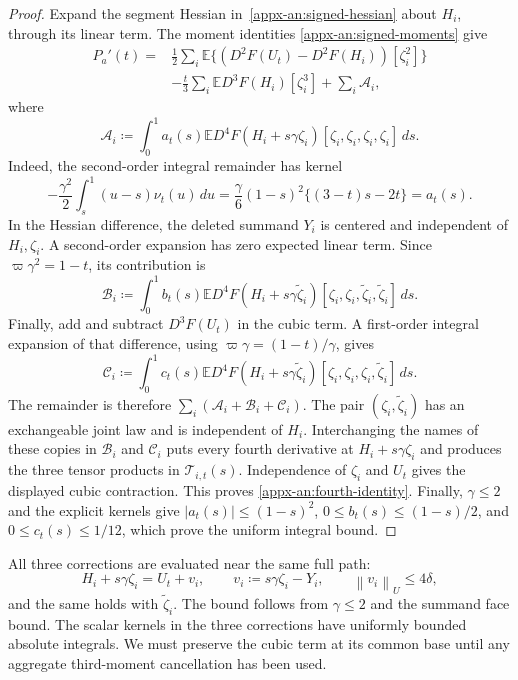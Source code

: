 \documentclass[11pt,letterpaper]{article}
\theoremstyle{remark}
\newcommand{\E}{\mathbb E}
\newcommand{\norm}[1]{\left\lVert#1\right\rVert}
\newcommand{\dd}{\,d}
\begin{document}
\begin{proof}
Expand the segment Hessian in~\eqref{appx-an:signed-hessian}
about \(H_i\), through its linear term. The moment identities
\eqref{appx-an:signed-moments} give
\begin{align*}
 P_a'(t)
 ={}&\frac12\sum_i\E\{(D^2F(U_t)-D^2F(H_i))[\zeta_i^2]\}\\
 &-\frac t3\sum_i\E D^3F(H_i)[\zeta_i^3]
       +\sum_i\mathcal A_i,
\end{align*}
where
\begin{equation}
 \mathcal A_i\coloneqq\int_0^1 a_t(s)
 \E D^4F(H_i+s\gamma\zeta_i)
       [\zeta_i,\zeta_i,\zeta_i,\zeta_i]\dd s.
 \label{appx-an:A}
\end{equation}
Indeed, the second-order integral remainder has kernel
\[
 -\frac{\gamma^2}{2}\int_s^1(u-s)\nu_t(u)\dd u
 =\frac\gamma6(1-s)^2\{(3-t)s-2t\}=a_t(s).
\]
In the Hessian difference, the deleted summand \(Y_i\) is centered
and independent of \(H_i,\zeta_i\). A second-order expansion has
zero expected linear term. Since \(\varpi\gamma^2=1-t\), its
contribution is
\begin{equation}
 \mathcal B_i\coloneqq\int_0^1 b_t(s)
 \E D^4F(H_i+s\gamma\widetilde\zeta_i)
       [\zeta_i,\zeta_i,\widetilde\zeta_i,\widetilde\zeta_i]\dd s.
 \label{appx-an:B}
\end{equation}
Finally, add and subtract \(D^3F(U_t)\) in the cubic term.
A first-order integral expansion of that difference, using
\(\varpi\gamma=(1-t)/\gamma\), gives
\begin{equation}
 \mathcal C_i\coloneqq\int_0^1 c_t(s)
 \E D^4F(H_i+s\gamma\widetilde\zeta_i)
       [\zeta_i,\zeta_i,\zeta_i,\widetilde\zeta_i]\dd s.
 \label{appx-an:C}
\end{equation}
The remainder is therefore \(\sum_i(\mathcal A_i+\mathcal B_i+\mathcal C_i)\).
The pair \((\zeta_i,\widetilde\zeta_i)\) has an exchangeable joint
law and is independent of \(H_i\). Interchanging the names of these
copies in \(\mathcal B_i\) and \(\mathcal C_i\) puts every fourth
derivative at \(H_i+s\gamma\zeta_i\) and produces the three tensor
products in \(\mathcal T_{i,t}(s)\). Independence of \(\zeta_i\)
and \(U_t\) gives the displayed cubic contraction. This proves
\eqref{appx-an:fourth-identity}. Finally, \(\gamma\le2\) and the
explicit kernels give
\( |a_t(s)|\le(1-s)^2\),
\(0\le b_t(s)\le(1-s)/2\), and
\(0\le c_t(s)\le1/12\), which prove the uniform integral bound.
\end{proof}

All three corrections are evaluated near the same full path:
\begin{equation}
 H_i+s\gamma\zeta_i=U_t+v_i,\qquad
 v_i\coloneqq s\gamma\zeta_i-Y_i,\qquad \norm{v_i}_U\le4\delta,
 \label{appx-an:translates}
\end{equation}
and the same holds with \(\widetilde\zeta_i\). The bound follows
from \(\gamma\le2\) and the summand face bound. The scalar kernels
in the three corrections have uniformly bounded absolute integrals.
We must preserve the cubic term at its common base until any
aggregate third-moment cancellation has been used.
\end{document}

